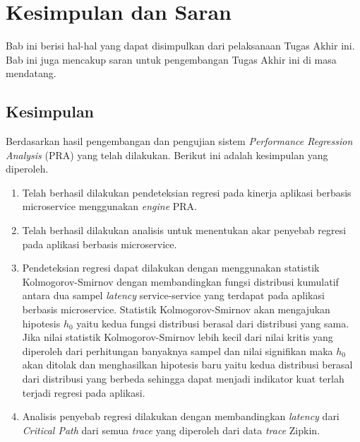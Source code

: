 \chapter{Kesimpulan dan Saran}
Bab ini berisi hal-hal yang dapat disimpulkan dari pelaksanaan Tugas Akhir ini. Bab ini juga mencakup saran untuk pengembangan Tugas Akhir ini di masa mendatang.

\section{Kesimpulan}
Berdasarkan hasil pengembangan dan pengujian sistem \textit{Performance Regression Analysis} (PRA) yang telah dilakukan. Berikut ini adalah kesimpulan yang diperoleh.
\begin{enumerate}
	\item Telah berhasil dilakukan pendeteksian regresi pada kinerja aplikasi berbasis microservice menggunakan \textit{engine} PRA.
	\item Telah berhasil dilakukan analisis untuk menentukan akar penyebab regresi pada aplikasi berbasis microservice.
	\item Pendeteksian regresi dapat dilakukan dengan menggunakan statistik Kolmogorov-Smirnov dengan membandingkan fungsi distribusi kumulatif antara dua sampel \textit{latency} service-service yang terdapat pada aplikasi berbasis microservice. Statistik Kolmogorov-Smirnov akan mengajukan hipotesis $h_{0}$ yaitu kedua fungsi distribusi berasal dari distribusi yang sama. Jika nilai statistik Kolmogorov-Smirnov lebih kecil dari nilai kritis yang diperoleh dari perhitungan banyaknya sampel dan nilai signifikan maka $h_{0}$ akan ditolak dan menghasilkan hipotesis baru yaitu kedua distribusi berasal dari distribusi yang berbeda sehingga dapat menjadi indikator kuat terlah terjadi regresi pada aplikasi.	
	\item Analisis penyebab regresi dilakukan dengan membandingkan \textit{latency} dari \textit{Critical Path} dari semua \textit{trace} yang diperoleh dari data \textit{trace} Zipkin. 
	

\end{enumerate}
